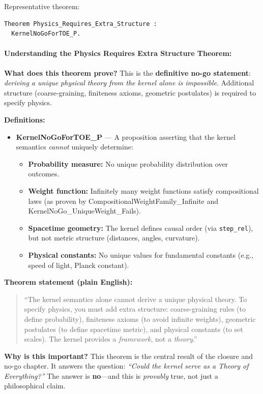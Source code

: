 Representative theorem:
\begin{lstlisting}
Theorem Physics_Requires_Extra_Structure :
  KernelNoGoForTOE_P.
\end{lstlisting}

\paragraph{Understanding the Physics Requires Extra Structure Theorem:}

\textbf{What does this theorem prove?} This is the \textbf{definitive no-go statement}: \textit{deriving a unique physical theory from the kernel alone is impossible}. Additional structure (coarse-graining, finiteness axioms, geometric postulates) is required to specify physics.

\textbf{Definitions:}
\begin{itemize}
    \item \textbf{KernelNoGoForTOE\_P} — A proposition asserting that the kernel semantics \textit{cannot} uniquely determine:
    \begin{itemize}
        \item \textbf{Probability measure:} No unique probability distribution over outcomes.
        \item \textbf{Weight function:} Infinitely many weight functions satisfy compositional laws (as proven by CompositionalWeightFamily\_Infinite and KernelNoGo\_UniqueWeight\_Fails).
        \item \textbf{Spacetime geometry:} The kernel defines causal order (via \texttt{step\_rel}), but not metric structure (distances, angles, curvature).
        \item \textbf{Physical constants:} No unique values for fundamental constants (e.g., speed of light, Planck constant).
    \end{itemize}
\end{itemize}

\textbf{Theorem statement (plain English):}
\begin{quote}
``The kernel semantics alone cannot derive a unique physical theory. To specify physics, you must add extra structure: coarse-graining rules (to define probability), finiteness axioms (to avoid infinite weights), geometric postulates (to define spacetime metric), and physical constants (to set scales). The kernel provides a \textit{framework}, not a \textit{theory}.''
\end{quote}

\textbf{Why is this important?} This theorem is the central result of the closure and no-go chapter. It answers the question: \textit{``Could the kernel serve as a Theory of Everything?''} The answer is \textbf{no}---and this is \textit{provably} true, not just a philosophical claim.

